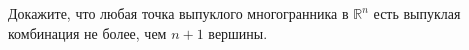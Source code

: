 Докажите, что любая точка выпуклого многогранника в $\mathbb{R}^n$ есть выпуклая комбинация не более, чем $n + 1$ вершины.